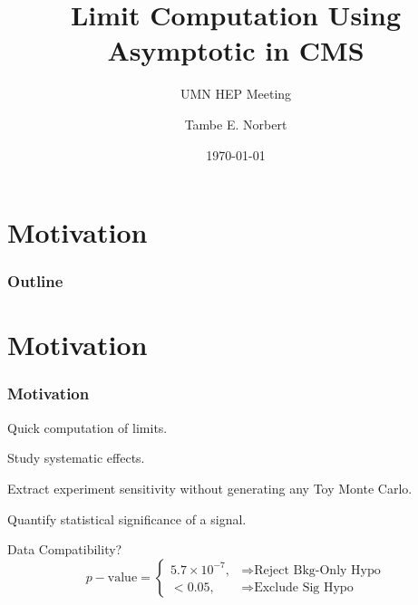 \documentclass[12pt]{beamer}
\title{\LARGE Limit Computation Using Asymptotic in CMS}
\subtitle{\small UMN HEP Meeting}
\author{Tambe E. Norbert}
\date{\today}
\institute{ \url{norbert@physics.umn.edu}}
\begin{document}
\begin{frame}[c]
\titlepage
\end{frame}
\section{Motivation}
\begin{frame}
\Large
\frametitle{Outline}
\tableofcontents
\end{frame}

\section*{Motivation}
\begin{frame}
\frametitle{Motivation}
\begin{itemize}
\Large{
\item <1-| alert@1> Quick computation of limits. 
\item  Study systematic effects.
\item Extract experiment sensitivity without generating any Toy Monte Carlo.
\item  Quantify statistical significance of a signal.
}
\end{itemize}
\begin{varblock}[7cm]{Data Compatibility?}
\[\label{eq:PVALUE}
 p-\mbox{value} = \left\lbrace 
  \begin{array}{ll}
  5.7 \times 10^{-7} , & \Rightarrow  \mbox{Reject Bkg-Only Hypo}\\
  < 0.05 ,& \Rightarrow  \mbox{Exclude Sig Hypo}
  \end{array}
 \right.
 \]
\end{varblock}
\end{frame}
\end{document}
